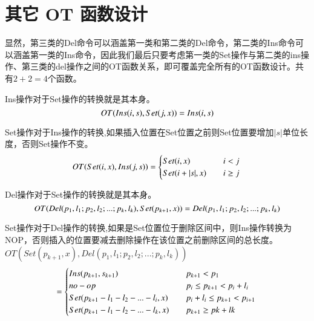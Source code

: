\section{其它 OT 函数设计}
\par 显然，第三类的Del命令可以涵盖第一类和第二类的Del命令，第二类的Ins命令可以涵盖第一类的Ins命令，因此我们最后只要考虑第一类的Set操作与第二类的ins操作、第三类的del操作之间的OT函数关系，即可覆盖完全所有的OT函数设计。共有$2+2=4$个函数。

\par Ins操作对于Set操作的转换就是其本身。
\begin{equation}
OT(Ins(i,s),Set(j,x))= Ins(i,s)\\
\end{equation}

\par Set操作对于Ins操作的转换,如果插入位置在Set位置之前则Set位置要增加$|s|$单位长度，否则Set操作不变。
\begin{equation}
OT(Set(i,x),Ins(j,s))= \begin{cases}
{Set(i,x)}  \quad & i<j \\
{Set(i+|s|,x)} \quad  &i \ge j \end{cases} \\
\end{equation}

\par Del操作对于Set操作的转换就是其本身。
\begin{equation}
OT(Del(p_1,l_1;p_2,l_2;...;p_k,l_k),Set(p_{k+1},x)) = Del(p_1,l_1;p_2,l_2;...;p_k,l_k)\\
\end{equation}

\par Set操作对于Del操作的转换,如果是Set位置位于删除区间中，则Ins操作转换为NOP，否则插入的位置要减去删除操作在该位置之前删除区间的总长度。
$OT(Set(p_{k+1},x),Del(p_1,l_1;p_2,l_2;...;p_k,l_k))$
\begin{equation}
= \begin{cases}
Ins(p_{k+1},s_{k+1}) \quad & p_{k+1} < p_1 \\
no-op \quad & p_i \le p_{k+1} < p_i+l_i\\
Set(p_{k+1}-l_1-l_2-...-l_i,x) \quad & p_i+l_i \le p_{k+1} < p_{i+1}\\
Set(p_{k+1}-l_1-l_2-...-l_k,x) \quad & p_{k+1} \ge pk+lk \end{cases}\\
\end{equation}